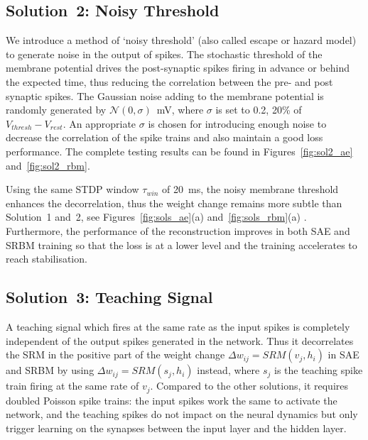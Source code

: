 \subsection{Solution~2: Noisy Threshold}
We introduce a method of `noisy threshold' (also called escape or hazard model)~\cite{gerstner2002spiking} to generate noise in the output of spikes.
The stochastic threshold of the membrane potential drives the post-synaptic spikes firing in advance or behind the expected time, thus reducing the correlation between the pre- and post synaptic spikes.
The Gaussian noise adding to the membrane potential is randomly generated by $\mathcal{N}(0, \sigma)$~mV, where $\sigma$ is set to 0.2, 20\% of $V_{thresh} - V_{rest}.$
An appropriate $\sigma$ is chosen for introducing enough noise to decrease the correlation of the spike trains and also maintain a good loss performance.
The complete testing results can be found in Figures~\ref{fig:sol2_ae} and~\ref{fig:sol2_rbm}.

Using the same STDP window $\tau_{win}$ of 20~ms, the noisy membrane threshold enhances the decorrelation, thus the weight change remains more subtle than Solution~1 and~2, see Figures~\ref{fig:sols_ae}(a) and~\ref{fig:sols_rbm}(a) .
Furthermore, the performance of the reconstruction improves in both SAE and SRBM training so that the loss is at a lower level and the training accelerates to reach stabilisation. %


\subsection{Solution~3: Teaching Signal}
A teaching signal which fires at the same rate as the input spikes is completely independent of the output spikes generated in the network.
Thus it decorrelates the SRM in the positive part of the weight change $\Delta w_{ij} = SRM(v_j,h_i)$ in SAE and SRBM by using $\Delta w_{ij}=SRM(s_j,h_i)$ instead, where $s_j$ is the teaching spike train firing at the same rate of $v_j$.
Compared to the other solutions, it requires doubled Poisson spike trains: the input spikes work the same to activate the network, and the teaching spikes do not impact on the neural dynamics but only trigger learning on the synapses between the input layer and the hidden layer.

